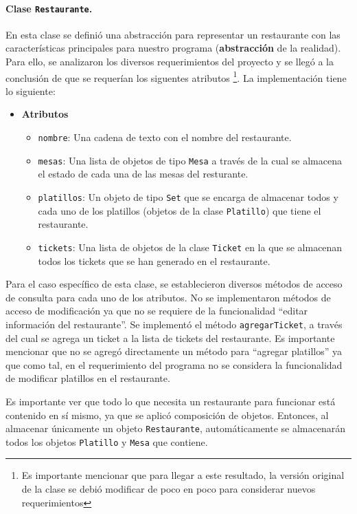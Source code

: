 \paragraph{Clase \texttt{Restaurante}.} En esta clase se definió una 
abstracción para representar un restaurante con las características 
principales para nuestro programa (\textbf{abstracción} de la realidad). Para 
ello, se analizaron los diversos requerimientos del proyecto y se llegó a la 
conclusión de que se requerían los siguentes atributos \footnote{Es importante 
mencionar que para llegar a este resultado, la versión original de la clase se
debió modificar de poco en poco para considerar nuevos requerimientos}. La 
implementación tiene lo siguiente:

\begin{itemize}
  \item \textbf{Atributos}
  \begin{itemize}
    \item \texttt{nombre}: Una cadena de texto con el nombre del restaurante.
    \item  \texttt{mesas}: Una lista de objetos de tipo \texttt{Mesa} a través 
      de la cual se almacena el estado de cada una de las mesas del resturante.
    \item \texttt{platillos}: Un objeto de tipo \texttt{Set} que se encarga de
      almacenar todos y cada uno de los platillos (objetos de la clase 
      \texttt{Platillo}) que tiene el restaurante.
    \item \texttt{tickets}: Una lista de objetos de la clase \texttt{Ticket} en 
      la que se almacenan todos los tickets que se han generado en el 
      restaurante.
  \end{itemize}
\end{itemize}

Para el caso específico de esta clase, se establecieron diversos métodos de 
acceso de consulta para cada uno de los atributos. No se implementaron métodos 
de acceso de modificación ya que no se requiere de la funcionalidad ``editar 
información del restaurante''. Se implementó el método \texttt{agregarTicket},
a través del cual se agrega un ticket a la lista de tickets del restaurante.  
Es importante mencionar que no se agregó directamente un método para ``agregar 
platillos'' ya que como tal, en el requerimiento del programa no se considera 
la funcionalidad de modificar platillos en el restaurante.

Es importante ver que todo lo que necesita un restaurante para funcionar está 
contenido en sí mismo, ya que se aplicó composición de objetos. Entonces, al 
almacenar únicamente un objeto \texttt{Restaurante}, automáticamente se 
almacenarán todos los objetos \texttt{Platillo} y \texttt{Mesa} que contiene.

